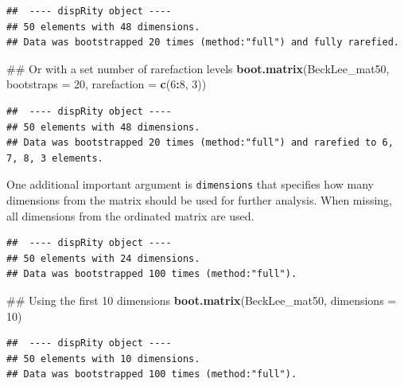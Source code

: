 \documentclass[]{book}
\newenvironment{Shaded}{\begin{snugshade}}{\end{snugshade}}
\newcommand{\KeywordTok}[1]{\textcolor[rgb]{0.13,0.29,0.53}{\textbf{#1}}}
\newcommand{\DataTypeTok}[1]{\textcolor[rgb]{0.13,0.29,0.53}{#1}}
\newcommand{\DecValTok}[1]{\textcolor[rgb]{0.00,0.00,0.81}{#1}}
\newcommand{\FloatTok}[1]{\textcolor[rgb]{0.00,0.00,0.81}{#1}}
\newcommand{\OperatorTok}[1]{\textcolor[rgb]{0.81,0.36,0.00}{\textbf{#1}}}
\newcommand{\NormalTok}[1]{#1}
\theoremstyle{definition}
\theoremstyle{definition}
\theoremstyle{remark}
\begin{document}
\begin{verbatim}
##  ---- dispRity object ---- 
## 50 elements with 48 dimensions.
## Data was bootstrapped 20 times (method:"full") and fully rarefied.
\end{verbatim}

\begin{Shaded}
\begin{Highlighting}[]
\NormalTok{## Or with a set number of rarefaction levels}
\KeywordTok{boot.matrix}\NormalTok{(BeckLee_mat50, }\DataTypeTok{bootstraps =} \DecValTok{20}\NormalTok{, }\DataTypeTok{rarefaction =} \KeywordTok{c}\NormalTok{(}\DecValTok{6}\OperatorTok{:}\DecValTok{8}\NormalTok{, }\DecValTok{3}\NormalTok{))}
\end{Highlighting}
\end{Shaded}

\begin{verbatim}
##  ---- dispRity object ---- 
## 50 elements with 48 dimensions.
## Data was bootstrapped 20 times (method:"full") and rarefied to 6, 7, 8, 3 elements.
\end{verbatim}

One additional important argument is \texttt{dimensions} that specifies
how many dimensions from the matrix should be used for further analysis.
When missing, all dimensions from the ordinated matrix are used.

\begin{Shaded}
\end{Shaded}

\begin{verbatim}
##  ---- dispRity object ---- 
## 50 elements with 24 dimensions.
## Data was bootstrapped 100 times (method:"full").
\end{verbatim}

\begin{Shaded}
\begin{Highlighting}[]
\NormalTok{## Using the first 10 dimensions}
\KeywordTok{boot.matrix}\NormalTok{(BeckLee_mat50, }\DataTypeTok{dimensions =} \DecValTok{10}\NormalTok{)}
\end{Highlighting}
\end{Shaded}

\begin{verbatim}
##  ---- dispRity object ---- 
## 50 elements with 10 dimensions.
## Data was bootstrapped 100 times (method:"full").
\end{verbatim}
\end{document}
